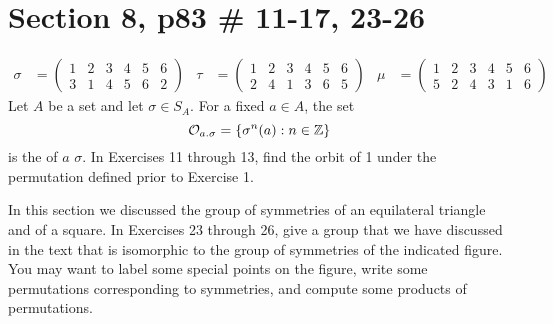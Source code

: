 \documentclass{article}
\newcommand{\assignment}{Section 8, p83 \# 11-17, 23-26}
\begin{document}
\section*{\assignment}

\begin{align*}
    \sigma & = \begin{pmatrix}
        1 & 2 & 3 & 4 & 5 & 6 \\
        3 & 1 & 4 & 5 & 6 & 2
    \end{pmatrix} & \tau & = \begin{pmatrix}
        1 & 2 & 3 & 4 & 5 & 6 \\
        2 & 4 & 1 & 3 & 6 & 5
    \end{pmatrix} & \mu & = \begin{pmatrix}
        1 & 2 & 3 & 4 & 5 & 6 \\
        5 & 2 & 4 & 3 & 1 & 6
    \end{pmatrix}
\end{align*}
Let $A$ be a set and let $\sigma \in S_A$. For a fixed $a \in A$, the set
\[
    \mathcal{O}_{a.\sigma} = \{\sigma^n(a) : n \in \mathbb{Z}\}
\]
is the  of $a$  $\sigma$. In Exercises 11 through 13, find the orbit of 1 under the permutation defined prior to Exercise 1.
\begin{enumerate}
\end{enumerate}
In this section we discussed the group of symmetries of an equilateral triangle and of a square. In Exercises 23 through 26, give a group that we have discussed in the text that is isomorphic to the group of symmetries of the indicated figure. You may want to label some special points on the figure, write some permutations corresponding to symmetries, and compute some products of permutations.
\begin{enumerate}
\end{enumerate}
\end{document}
